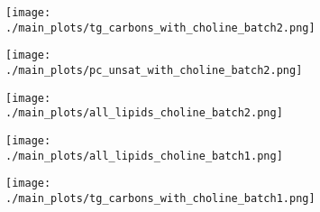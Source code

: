 \begin{figure}[ht]
    \begin{subfigure}[t]{.35\textwidth}
        \caption{}
        \texttt{[image: ./main\_plots/tg\_carbons\_with\_choline\_batch2.png]}        
    \end{subfigure} 
    \begin{subfigure}[t]{.35\textwidth}
        \caption{}
        \texttt{[image: ./main\_plots/pc\_unsat\_with\_choline\_batch2.png]}        
    \end{subfigure} 
    \begin{subfigure}[t]{.35\textwidth}
        \caption{}
        \texttt{[image: ./main\_plots/all\_lipids\_choline\_batch2.png]}        
    \end{subfigure} 
    \begin{subfigure}[t]{.35\textwidth}
        \caption{}
        \texttt{[image: ./main\_plots/all\_lipids\_choline\_batch1.png]}        
    \end{subfigure} 

    \begin{subfigure}[t]{.35\textwidth}
        \caption{}
        \texttt{[image: ./main\_plots/tg\_carbons\_with\_choline\_batch1.png]}        
    \end{subfigure} 
    


\end{figure}
